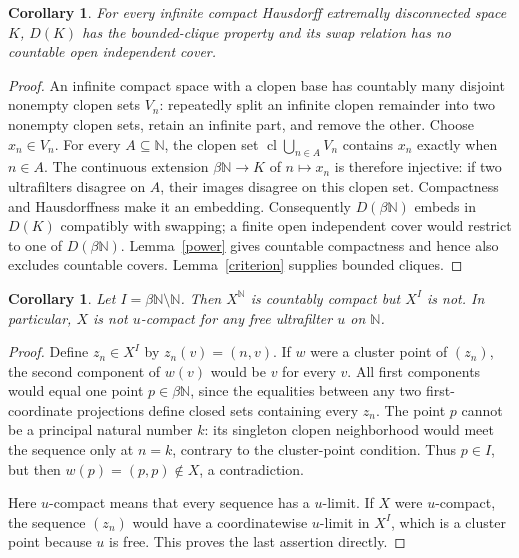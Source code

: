 \documentclass[11pt]{article}
\newtheorem{corollary}[theorem]{Corollary}
\newcommand{\N}{\mathbb N}
\newcommand{\cl}{\operatorname{cl}}
\begin{document}
\begin{corollary}\label{general}
For every infinite compact Hausdorff extremally disconnected space $K$,
$D(K)$ has the bounded-clique property and its swap relation has no
countable open independent cover.
\end{corollary}
\begin{proof}
An infinite compact space with a clopen base has countably many disjoint
nonempty clopen sets $V_n$: repeatedly split an infinite clopen remainder
into two nonempty clopen sets, retain an infinite part, and remove the other.
Choose $x_n\in V_n$. For every $A\subseteq\N$, the clopen set
$\cl\bigcup_{n\in A}V_n$ contains $x_n$ exactly when $n\in A$.
The continuous extension $\beta\N\to K$ of $n\mapsto x_n$ is therefore
injective: if two ultrafilters disagree on $A$, their images disagree on
this clopen set. Compactness and Hausdorffness make it an embedding.
Consequently $D(\beta\N)$ embeds in $D(K)$ compatibly with swapping;
a finite open independent cover would restrict to one of $D(\beta\N)$.
Lemma~\ref{power} gives countable compactness and hence also excludes
countable covers. Lemma~\ref{criterion} supplies bounded cliques.
\end{proof}

\begin{corollary}\label{largepower}
Let $I=\beta\N\setminus\N$. Then $X^\N$ is countably compact but
$X^I$ is not. In particular, $X$ is not $u$-compact for any free
ultrafilter $u$ on $\N$.
\end{corollary}
\begin{proof}
Define $z_n\in X^I$ by $z_n(v)=(n,v)$. If $w$ were a cluster point
of $(z_n)$, the second component of $w(v)$ would be $v$ for every $v$.
All first components would equal one point $p\in\beta\N$, since the
equalities between any two first-coordinate projections define closed sets
containing every $z_n$. The point $p$ cannot be a principal natural number
$k$: its singleton clopen neighborhood would meet the sequence only at
$n=k$, contrary to the cluster-point condition. Thus $p\in I$, but then
$w(p)=(p,p)\notin X$, a contradiction.

Here $u$-compact means that every sequence has a $u$-limit. If $X$ were
$u$-compact, the sequence $(z_n)$ would have a coordinatewise $u$-limit
in $X^I$, which is a cluster point because $u$ is free. This proves the
last assertion directly.
\end{proof}
\end{document}
